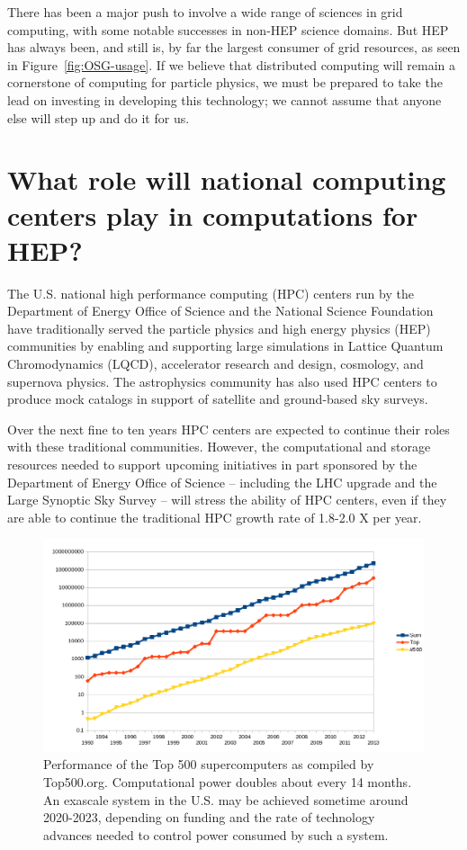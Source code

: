 There has been a major push to involve a wide range of sciences in grid computing, with some notable successes in non-HEP science domains.  But HEP has always been, and still is, by far the largest consumer of grid resources, as seen in Figure~\ref{fig:OSG-usage}.  If we believe that distributed computing will remain a cornerstone of computing for particle physics, we must be prepared to take the lead on investing in developing this technology; we cannot assume that anyone else will step up and do it for us.

\section{What role will national computing centers play in computations for HEP?}

The U.S. national high performance computing (HPC) centers run by the Department of Energy Office of Science and the National Science Foundation have traditionally served the particle physics and high energy physics (HEP) communities by enabling and supporting large simulations in Lattice Quantum Chromodynamics (LQCD), accelerator research and design, cosmology, and supernova physics. The astrophysics community has also used HPC centers to produce mock catalogs in support of satellite and ground-based sky surveys.
 
Over the next fine to ten years HPC centers are expected to continue their roles with these traditional communities. However, the computational and storage resources needed to support upcoming initiatives in part sponsored by the Department of Energy Office of Science -- including the LHC upgrade and  the Large Synoptic Sky Survey -- will stress the ability of HPC centers, even if they are able to continue the traditional HPC growth rate of 1.8-2.0 X per year.

\begin{figure}[h]
\includegraphics[width=\textwidth]{CpF-I2/images/Top500-plot.png}
\caption{Performance of the Top 500 supercomputers as compiled by Top500.org.  Computational power doubles about every 14 months. An exascale system in the U.S. may be achieved sometime around 2020-2023, depending on funding and the rate of technology advances needed to control power consumed by such a system.}
\label{fig:Top-500}
\end{figure}

